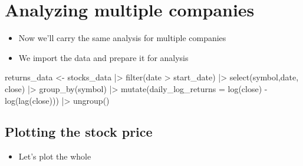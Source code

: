 \documentclass[
  letterpaper,
  DIV=11,
  numbers=noendperiod]{scrreprt}
\newenvironment{Shaded}{\begin{snugshade}}{\end{snugshade}}
\newcommand{\AttributeTok}[1]{\textcolor[rgb]{0.40,0.45,0.13}{#1}}
\newcommand{\FunctionTok}[1]{\textcolor[rgb]{0.28,0.35,0.67}{#1}}
\newcommand{\NormalTok}[1]{\textcolor[rgb]{0.00,0.23,0.31}{#1}}
\newcommand{\OtherTok}[1]{\textcolor[rgb]{0.00,0.23,0.31}{#1}}
\newcommand{\SpecialCharTok}[1]{\textcolor[rgb]{0.37,0.37,0.37}{#1}}
\providecommand{\tightlist}{%
  \setlength{\itemsep}{0pt}\setlength{\parskip}{0pt}}\usepackage{longtable,booktabs,array}
\theoremstyle{definition}
\theoremstyle{remark}
\begin{document}

\chapter{Analyzing multiple
companies}\label{analyzing-multiple-companies}

\begin{itemize}
\item
  Now we'll carry the same analysis for multiple companies
\item
  We import the data and prepare it for analysis
\end{itemize}

\begin{Shaded}
\begin{Highlighting}[]
\NormalTok{returns\_data }\OtherTok{\textless{}{-}} 
\NormalTok{  stocks\_data }\SpecialCharTok{|\textgreater{}} 
  \FunctionTok{filter}\NormalTok{(date }\SpecialCharTok{\textgreater{}}\NormalTok{ start\_date) }\SpecialCharTok{|\textgreater{}} 
  \FunctionTok{select}\NormalTok{(symbol,date, close) }\SpecialCharTok{|\textgreater{}} 
  \FunctionTok{group\_by}\NormalTok{(symbol) }\SpecialCharTok{|\textgreater{}} 
  \FunctionTok{mutate}\NormalTok{(}\AttributeTok{daily\_log\_returns =} \FunctionTok{log}\NormalTok{(close) }\SpecialCharTok{{-}} \FunctionTok{log}\NormalTok{(}\FunctionTok{lag}\NormalTok{(close))) }\SpecialCharTok{|\textgreater{}} 
  \FunctionTok{ungroup}\NormalTok{()}
\end{Highlighting}
\end{Shaded}

\section{Plotting the stock price}\label{plotting-the-stock-price}

\begin{itemize}
\tightlist
\item
  Let's plot the whole
\end{itemize}
\end{document}
